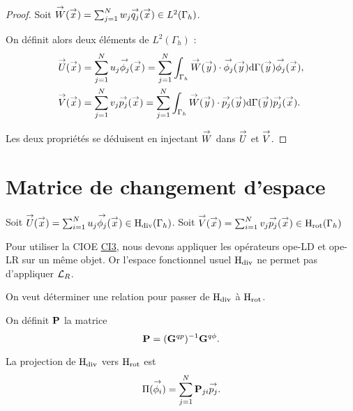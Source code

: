   \begin{proof}
    Soit  \(\vect{W}(\vx) = \sum_{j=1}^N w_j \qj(\vx) \in L^2(\Gamma_h)\).

    On définit alors deux éléments de \(L^2(\Gamma_h)\) :
    \begin{align*}
      \vect{U}(\vx) &= \sum_{j=1}^N u_j \phij(\vx) = \sum_{j=1}^N \int_{\Gamma_h}\vect{W}(\vy)\cdot\phij(\vy)\dd{\Gamma}(\vy) \phij(\vx),
      \\
      \vect{V}(\vx) &= \sum_{j=1}^N v_j \pj(\vx) = \sum_{j=1}^N \int_{\Gamma_h}\vect{W}(\vy)\cdot\pj(\vy)\dd{\Gamma}(\vy) \pj(\vx).
    \end{align*}

    Les deux propriétés se déduisent en injectant \(\vect{W}\) dans \(\vect{U}\) et \(\vect{V}\).
  \end{proof}




\section{Matrice de changement d'espace}

  Soit \(\vect{U}(\vx) = \sum_{i=1}^N u_j \phij(\vx) \in \Hdiv(\Gamma_h)\).
  Soit \(\vect{V}(\vx) = \sum_{i=1}^N v_j \pj(\vx) \in \Hrot(\Gamma_h)\)  

  Pour utiliser la CIOE \hyperlink{ci3}{CI3}, nous devons appliquer les opérateurs \gls{ope-LD} et \gls{ope-LR} sur un même objet. Or l'espace fonctionnel usuel \(\Hdiv\) ne permet pas d'appliquer \(\LR\). 

  On veut déterminer une relation pour passer de \(\Hdiv\) à \(\Hrot\).

  \begin{defn}On définit \(\mPP\) la matrice
  \label{def:eq_int:matrice_changment_mP}
    \begin{equation*}
      \mPP = (\mG{q}{p})^{-1}\mG{q}{\phi}.
    \end{equation*}
  \end{defn}

  \begin{prop}La projection de \(\Hdiv\) vers \(\Hrot\) est
    \begin{equation*}
      \Pi(\phii) = \sum_{j=1}^N \mPP_{ji}\pj.
    \end{equation*}
  \end{prop}

